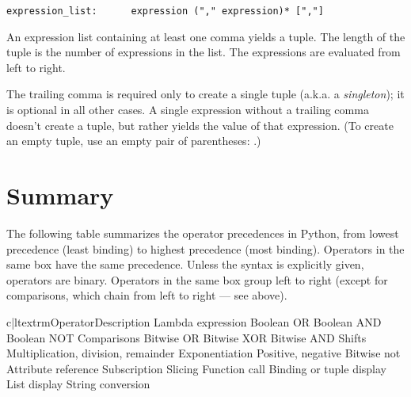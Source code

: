 \begin{verbatim}
expression_list:      expression ("," expression)* [","]
\end{verbatim}

An expression list containing at least one comma yields a
tuple.  The length of the tuple is the number of expressions in the
list.  The expressions are evaluated from left to right.

The trailing comma is required only to create a single tuple (a.k.a. a
\emph{singleton}); it is optional in all other cases.  A single
expression without a trailing comma doesn't create a
tuple, but rather yields the value of that expression.
(To create an empty tuple, use an empty pair of parentheses:
\code{()}.)


\section{Summary\label{summary}}

The following table summarizes the operator
precedences in Python, from lowest
precedence (least binding) to highest precedence (most binding).
Operators in the same box have the same precedence.  Unless the syntax
is explicitly given, operators are binary.  Operators in the same box
group left to right (except for comparisons, which chain from left to
right --- see above).

\begin{tableii}{c|l}{textrm}{Operator}{Description}
    			{Lambda expression}
  \hline
    			{Boolean OR}
  \hline
    			{Boolean AND}
  \hline
    		{Boolean NOT}
  \hline
    \lineii{\code{<}, \code{<=}, \code{>}, \code{>=},
            \code{<>}, \code{!=}, \code{==}}
	   {Comparisons}
  \hline
    \lineii{\code{|}}				{Bitwise OR}
  \hline
    \lineii{\code{\^}}				{Bitwise XOR}
  \hline
    \lineii{\code{\&}}				{Bitwise AND}
  \hline
    \lineii{\code{<<}, \code{>>}}		{Shifts}
  \hline
  \hline
    \lineii{\code{*}, \code{/}, \code{\%}}
           {Multiplication, division, remainder}
  \hline
    \lineii{\code{**}}				{Exponentiation}
  \hline
    	{Positive, negative}
    			{Bitwise not}
  \hline
    	{Attribute reference}
    	{Subscription}
    	{Slicing}
    	{Function call}
  \hline
    	{Binding or tuple display}
    	{List display}
    	{String conversion}
\end{tableii}
